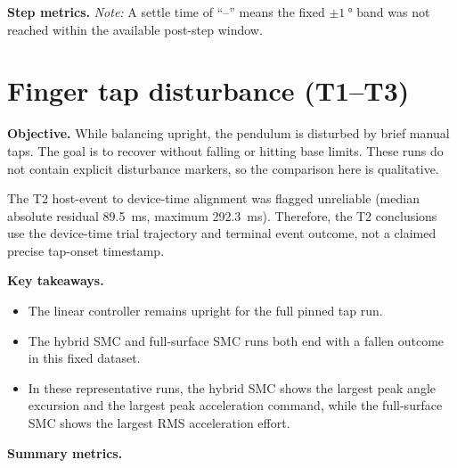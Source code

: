 \noindent\textbf{Step metrics.}
\noindent\emph{Note:} A settle time of ``--'' means the fixed $\pm\SI{1}{\degree}$ band was not reached within the available post-step window.

\clearpage

\section{Finger tap disturbance (T1--T3)}
\noindent\textbf{Objective.} While balancing upright, the pendulum is disturbed by brief manual taps. The goal is to recover without falling or hitting base limits. These runs do not contain explicit disturbance markers, so the comparison here is qualitative.

The T2 host-event to device-time alignment was flagged unreliable
(median absolute residual \SI{89.5}{ms}, maximum \SI{292.3}{ms}). Therefore,
the T2 conclusions use the device-time trial trajectory and terminal event
outcome, not a claimed precise tap-onset timestamp.

\noindent\textbf{Key takeaways.}
\begin{itemize}
  \item The linear controller remains upright for the full pinned tap run.
  \item The hybrid SMC and full-surface SMC runs both end with a fallen outcome in this fixed dataset.
  \item In these representative runs, the hybrid SMC shows the largest peak angle excursion and the largest peak acceleration command, while the full-surface SMC shows the largest RMS acceleration effort.
\end{itemize}

\noindent\textbf{Summary metrics.}


